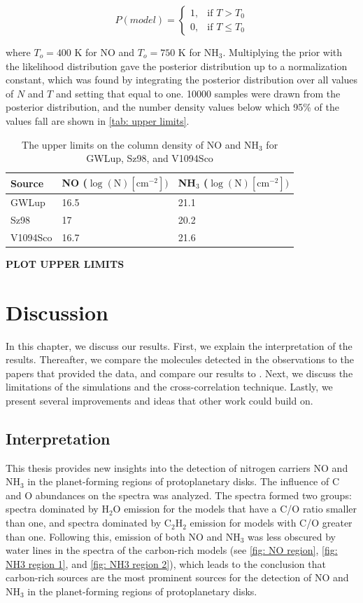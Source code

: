 \documentclass[oneside, single, authoryear, semicolon, 12pt]{lion-msc}
\newcommand{\4}{$_4$}
\newcommand{\3}{$_3$}
\newcommand{\2}{$_2$}
\begin{document}
\begin{equation}
    P(model) = 
    \begin{cases}
        1, & \text{if } T > T_0 \\
        0, & \text{if } T \leq T_0
    \end{cases}
\end{equation}

where $T_o=400$ K for NO and $T_o=750$ K for NH\3. Multiplying the prior with the likelihood distribution gave the posterior distribution up to a normalization constant, which was found by integrating the posterior distribution over all values of $N$ and $T$ and setting that equal to one. 10000 samples were drawn from the posterior distribution, and the number density values below which 95\% of the values fall are shown in \autoref{tab: upper limits}.

\begin{table}[H]
\begin{tabular}{lll}
\hline
Source   & NO ($\log(\mathrm{N})[\mathrm{cm}^{-2}])$   & NH\3 ($\log(\mathrm{N}) [\mathrm{cm}^{-2}])$\\ \hline
GWLup    & 16.5 & 21.1               \\
Sz98     & 17   & 20.2               \\
V1094Sco & 16.7 & 21.6               \\ \hline
\end{tabular}
\caption{The upper limits on the column density of NO and NH\3 for GWLup, Sz98, and V1094Sco}
\label{tab: upper limits}
\end{table}

\textbf{PLOT UPPER LIMITS}

\chapter{Discussion}\label{Ch: Discussion}
In this chapter, we discuss our results. First, we explain the interpretation of the results. Thereafter, we compare the molecules detected in the observations to the papers that provided the data, and compare our results to \cite{groningenthesis}. Next, we discuss the limitations of the simulations and the cross-correlation technique. Lastly, we present several improvements and ideas that other work could build on.
\section{Interpretation}
This thesis provides new insights into the detection of nitrogen carriers NO and NH\3 in the planet-forming regions of protoplanetary disks. The influence of C and O abundances on the spectra was analyzed. The spectra formed two groups: spectra dominated by H\2O emission for the models that have a C/O ratio smaller than one, and spectra dominated by C\2H\2 emission for models with C/O greater than one. Following this, emission of both NO and NH\3 was less obscured by water lines in the spectra of the carbon-rich models (see \autoref{fig: NO region}, \autoref{fig: NH3 region 1}, and \autoref{fig: NH3 region 2}), which leads to the conclusion that carbon-rich sources are the most prominent sources for the detection of NO and NH\3 in the planet-forming regions of protoplanetary disks. 
\end{document}
